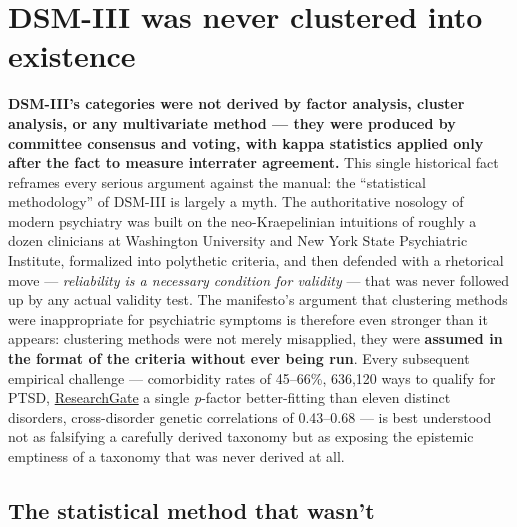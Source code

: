 ﻿\section{DSM-III was never clustered into existence}\label{11_dsm_iii-dsm-iii-was-never-clustered-into-existence}

\textbf{DSM-III's categories were not derived by factor analysis, cluster analysis, or any multivariate method --- they were produced by committee consensus and voting, with kappa statistics applied only after the fact to measure interrater agreement.} This single historical fact reframes every serious argument against the manual: the ``statistical methodology'' of DSM-III is largely a myth. The authoritative nosology of modern psychiatry was built on the neo-Kraepelinian intuitions of roughly a dozen clinicians at Washington University and New York State Psychiatric Institute, formalized into polythetic criteria, and then defended with a rhetorical move --- \emph{reliability is a necessary condition for validity} --- that was never followed up by any actual validity test. The manifesto's argument that clustering methods were inappropriate for psychiatric symptoms is therefore even stronger than it appears: clustering methods were not merely misapplied, they were \textbf{assumed in the format of the criteria without ever being run}. Every subsequent empirical challenge --- comorbidity rates of 45--66\%, 636,120 ways to qualify for PTSD, \href{https://www.researchgate.net/publication/260750182_636120_Ways_to_Have_Posttraumatic_Stress_Disorder}{ResearchGate} a single \emph{p}-factor better-fitting than eleven distinct disorders, cross-disorder genetic correlations of 0.43--0.68 --- is best understood not as falsifying a carefully derived taxonomy but as exposing the epistemic emptiness of a taxonomy that was never derived at all.

\subsection{The statistical method that wasn't}\label{11_dsm_iii-the-statistical-method-that-wasnt}

